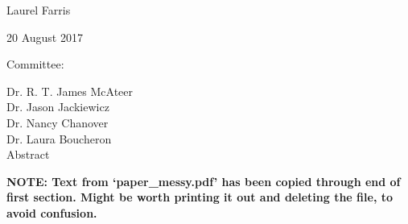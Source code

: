 \documentclass[modern]{aastex62}
\begin{document}
\begin{titlepage}\centering



    {\scshape\LARGE\par}
    \vfill
    {\Large Laurel Farris\par}
    \vfill
    {\large 20 August 2017\par}
    \vfill
    {\large Committee:}

    Dr. R. T. James McAteer\\
    Dr. Jason Jackiewicz\\
    Dr. Nancy Chanover\\
    Dr. Laura Boucheron\\
    \vfill
    {\large Abstract}
    \justify

    

    \centering
\end{titlepage}

\newpage
\setlength{\parskip}{0.5ex}
\setcounter{tocdepth}{3}
\tableofcontents



\newpage
\setlength{\parskip}{2.00ex}

\setlength{\marginparwidth}{1.50in}
\setlength{\marginparsep}{0.30in}


%


{\color{red}\textbf{
    NOTE: Text from `paper\_messy.pdf'
    has been copied through end of first section.
    Might be worth printing it out and deleting the file,
    to avoid confusion.
}}
\end{document}

